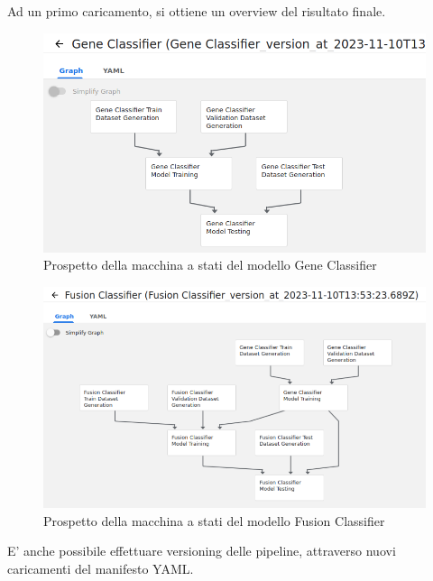 Ad un primo caricamento, si ottiene un overview del risultato finale.

\begin{figure}[H]
    \centering
    \includegraphics[width=\linewidth]{figures/ch4and5/stale.png}
    \caption[Prospetto della macchina a stati del modello Gene Classifier]{Prospetto della macchina a stati del modello Gene Classifier}
    \label{fig:cha6:stale}
\end{figure}

\begin{figure}[h]
    \centering
    \includegraphics[width=\linewidth]{figures/ch4and5/fusion_stale.png}
    \caption[Prospetto della macchina a stati del modello Fusion Classifier]{Prospetto della macchina a stati del modello Fusion Classifier}
    \label{fig:cha6:fusion_stale}
\end{figure}

E' anche possibile effettuare versioning delle pipeline, attraverso nuovi caricamenti del manifesto YAML.


